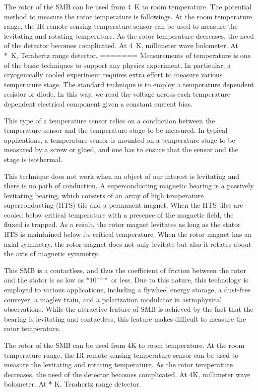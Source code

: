 The rotor of the SMB can be used from 4~K to room temperature. 
The potential method to measure the rotor temperature is followings.
At the room temperature range, the IR remote sensing temperature sensor can be used to measure the levitating and rotating temperature. 
As the rotor temperature decreases, the need of the detector becomes complicated. 
At 4~K, millimeter wave bolometer. 
At *~K, Terahertz range detector. 
=======
Measurements of temperature is one of the basic techniques to support any physics experiment.
In particular, a cryogenically cooled experiment requires extra effort to measure various temperature stage.
The standard technique is to employ a temperature dependent resistor or diode.
In this way, we read the voltage across each temperature dependent electrical component given a constant current bias.

This type of a temperature sensor relies on a conduction between the temperature sensor and the temperature stage to be measured.
In typical applications, a temperature sensor is mounted on a temperature stage to be measured by a screw or glued, and one has to ensure that the sensor and the stage is isothermal.

This technique does not work when an object of our interest is levitating and there is no path of conduction.
A superconducting magnetic bearing is a passively levitating bearing, which consists of an array of high temperature superconducting (HTS) tile and a permanent magnet.
When the HTS tiles are cooled below critical temperature with a presence of the magnetic field, the fluxed is trapped.
As a result, the rotor magnet levitates as long as the stator HTS is maintained below its critical temperature.
When the rotor magnet has an axial symmetry, the rotor magnet does not only levitate but also it rotates about the axis of magnetic symmetry.

This SMB is a contactless, and thus the coefficient of friction between the rotor and the stator is as low as $*10^{-4}*$ or less.
Due to this nature, this technology is employed to various applications, including a flywheel energy storage, a dust-free conveyer, a maglev train, and a polarization modulator in astrophysical observations.
While the attractive feature of SMB is achieved by the fact that the bearing is levitating and contactless, this feature makes difficult to measure the rotor temperature.

The rotor of the SMB can be used from 4K to room temperature.
At the room temperature range, the IR remote sensing temperature sensor can be used to measure the levitating and rotating temperature.
As the rotor temperature decreases, the need of the detector becomes complicated.
At 4K, millimeter wave bolometer.
At * K, Terahertz range detector.

